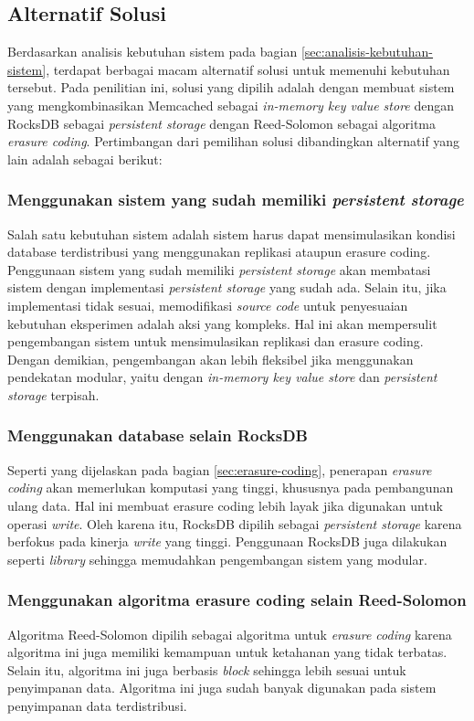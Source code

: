 \subsection{Alternatif Solusi}
\label{sec:alternatif-solusi}

Berdasarkan analisis kebutuhan sistem pada bagian \ref{sec:analisis-kebutuhan-sistem}, terdapat berbagai macam alternatif solusi untuk memenuhi kebutuhan tersebut. Pada penilitian ini, solusi yang dipilih adalah dengan membuat sistem yang mengkombinasikan Memcached sebagai \textit{in-memory key value store} dengan RocksDB sebagai \textit{persistent storage} dengan Reed-Solomon sebagai algoritma \textit{erasure coding}. Pertimbangan dari pemilihan solusi dibandingkan alternatif yang lain adalah sebagai berikut:

\subsubsection{Menggunakan sistem yang sudah memiliki \textit{persistent storage}}
Salah satu kebutuhan sistem adalah sistem harus dapat mensimulasikan kondisi database terdistribusi yang menggunakan replikasi ataupun erasure coding. Penggunaan sistem yang sudah memiliki \textit{persistent storage} akan membatasi sistem dengan implementasi \textit{persistent storage} yang sudah ada. Selain itu, jika implementasi tidak sesuai, memodifikasi \textit{source code} untuk penyesuaian kebutuhan eksperimen adalah aksi yang kompleks. Hal ini akan mempersulit pengembangan sistem untuk mensimulasikan replikasi dan erasure coding. Dengan demikian, pengembangan akan lebih fleksibel jika menggunakan pendekatan modular, yaitu dengan \textit{in-memory key value store} dan \textit{persistent storage} terpisah.

\subsubsection{Menggunakan database selain RocksDB}
Seperti yang dijelaskan pada bagian \ref{sec:erasure-coding}, penerapan \textit{erasure coding} akan memerlukan komputasi yang tinggi, khususnya pada pembangunan ulang data. Hal ini membuat erasure coding lebih layak jika digunakan untuk operasi \textit{write}. Oleh karena itu, RocksDB dipilih sebagai \textit{persistent storage} karena berfokus pada kinerja \textit{write} yang tinggi. Penggunaan RocksDB juga dilakukan seperti \textit{library} sehingga memudahkan pengembangan sistem yang modular. 

\subsubsection{Menggunakan algoritma erasure coding selain Reed-Solomon}
Algoritma Reed-Solomon dipilih sebagai algoritma untuk \textit{erasure coding} karena algoritma ini juga memiliki kemampuan untuk ketahanan yang tidak terbatas. Selain itu, algoritma ini juga berbasis \textit{block} sehingga lebih sesuai untuk penyimpanan data. Algoritma ini juga sudah banyak digunakan pada sistem penyimpanan data terdistribusi.

